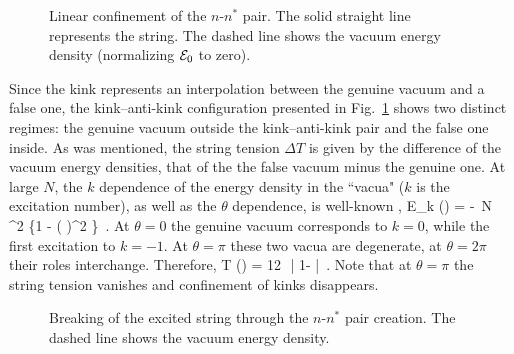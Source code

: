 \begin{figure}
\epsfxsize=8cm
\centerline{}
\caption{
Linear confinement of the $n$-$n^*$ pair. 
The solid straight line represents the string.
The dashed line shows
the vacuum energy density (normalizing ${\cal E}_0$ to zero).}
\label{tri}
\end{figure}

Since the kink represents an interpolation between
the genuine vacuum and a false one,  the kink--anti-kink configuration
presented in Fig.~\ref{tri} shows two distinct regimes:
the genuine vacuum outside the kink--anti-kink pair
and the false one inside. As was mentioned, the string tension $\Delta T$
is  given by the difference of the vacuum energy densities,
that of the the false vacuum minus the genuine one. At large $N$,
the $k$ dependence of the energy density in the ``vacua" 
($k$ is the excitation number), as well as the $\theta$ dependence, is
well-known \cite{nvacym},
\beq
{\cal E}_k (\theta) = -\, N\, \Lambda^2
\left\{1 - \left(
\right)^2
\right\}
\,.
\label{split}
\eeq
At $\theta = 0$ the genuine vacuum corresponds to $k=0$,
while the first excitation to $k=-1$. At $\theta =\pi$
these two vacua are degenerate, at $\theta = 2\pi$
their roles interchange. Therefore,
\beq
\Delta T (\theta ) = 12\pi\, \,\left| 1-\frac{\theta}{\pi}
\right|
\,.
\label{ctenp}
\eeq
Note that at $\theta =\pi$ the string tension vanishes
and confinement of kinks disappears.

\begin{figure}
\epsfxsize=8cm
\centerline{}
\caption{
Breaking of the excited string
through the $n$-$n^*$ pair creation. 
The dashed line shows
the vacuum energy density.}
\label{chetyre}
\end{figure}

